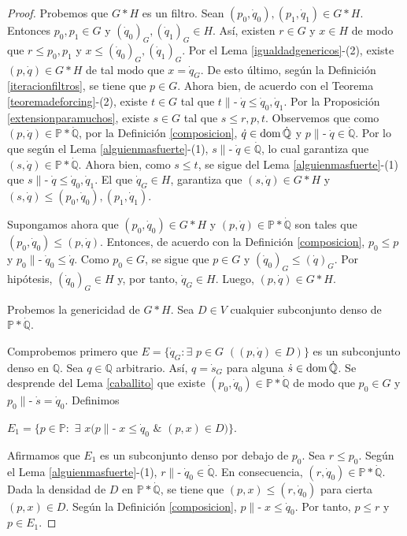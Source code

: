 \documentclass[11pt]{unam_tesis1}
\theoremstyle{MyThmStyle}
\theoremstyle{definition}
\theoremstyle{plain}
\theoremstyle{remark}
\def\dom{\mathop{\rm dom}\nolimits}
\def\forces{\mathop{\parallel\!\!\!-}\nolimits}
\let\Vdash\forces
\let\leq\leqslant
\begin{document}
\begin{proof}
Probemos que $G*H$ es un filtro. Sean $(p_0, \dot q_0), (p_1,\dot q_1)\in G*H$. Entonces $p_0,p_1\in G$ y $(\dot q_0)_G,(\dot q_1)_G\in H$. As\'i, existen $r\in G$ y $x\in H$ de modo que $r\leq p_0,p_1$ y $x\leq (\dot q_0)_G,(\dot q_1)_G$. Por el Lema \ref{igualdadgenericos}-(2), existe $(p,\dot q)\in G*H$ de tal modo que $x=\dot q_G$. De esto \'ultimo, seg\'un la Definici\'on \ref{iteracionfiltros}, se tiene que $p\in G$. Ahora bien, de acuerdo con el Teorema \ref{teoremadeforcing}-(2), existe $t\in G$ tal que $t\Vdash \dot q\leq \dot q_0,\dot q_1$. Por la Proposici\'on \ref{extensionparamuchos}, existe $s\in G$ tal que $s\leq r,p,t$. Observemos que como $(p,\dot q)\in \mathbb P*\dot{\mathbb Q}$, por la Definici\'on \ref{composicion}, $\dot q\in \dom \dot{\mathbb Q}$ y $p\Vdash \dot q\in \dot{\mathbb Q}$. Por lo que seg\'un el Lema \ref{alguienmasfuerte}-(1), $s\Vdash \dot q\in \dot{\mathbb Q}$, lo cual garantiza que $(s,\dot q)\in \mathbb P*\dot{\mathbb Q}$. Ahora bien, como $s\leq t$, se sigue del Lema \ref{alguienmasfuerte}-(1) que $s\Vdash \dot q\leq \dot q_0,\dot q_1$. El que $\dot q_G\in H$, garantiza que $(s,\dot q)\in G*H$ y $(s,\dot q)\leq (p_0,\dot q_0),(p_1,\dot q_1)$.

Supongamos ahora que $(p_0,\dot q_0)\in G*H$ y $(p,\dot q)\in \mathbb P*\dot{\mathbb Q}$ son tales que $(p_0,\dot q_0)\leq (p,\dot q)$. Entonces, de acuerdo con la Definici\'on \ref{composicion}, $p_0\leq p$ y $p_0\Vdash \dot q_0\leq \dot q$. Como $p_0\in G$, se sigue que $p\in G$ y $(\dot q_0)_G\leq (\dot q)_G$. Por hip\'otesis, $(\dot q_0)_G\in H$ y, por tanto, $\dot q_G\in H$. Luego, $(p,\dot q)\in G*H$.

Probemos la genericidad de $G*H$. Sea $D\in V$ cualquier subconjunto denso de $\mathbb P*\dot{\mathbb Q}$.

Comprobemos primero que $E=\{\dot q_G:\exists$ $p\in G$ $((p,\dot q)\in D )\}$ es un subconjunto denso en $\mathbb Q$. Sea $q\in \mathbb Q$ arbitrario. As\'i, $q=\dot s_G$ para alguna $\dot s\in \dom \dot{\mathbb Q}$. Se desprende del Lema \ref{caballito} que existe $(p_0,\dot q_0)\in \mathbb P*\dot{\mathbb Q}$ de modo que $p_0\in G$ y $p_0\Vdash \dot s=\dot q_0$. Definimos 

\begin{center}
$E_1=\{p\in \mathbb P:$ $\exists$ $x(p\Vdash x\leq \dot q_0$ $\&$ $(p,x)\in D) \}$.
\end{center}

Afirmamos que $E_1$ es un subconjunto denso por debajo de $p_0$. Sea $r\leq p_0$. Seg\'un el Lema \ref{alguienmasfuerte}-(1), $r\Vdash \dot q_0\in \dot{\mathbb Q}$. En consecuencia, $(r,\dot q_0)\in \mathbb P*\dot{\mathbb Q}$. Dada la densidad de $D$ en $\mathbb P*\dot{\mathbb Q}$, se tiene que $(p,x)\leq (r,\dot q_0)$ para cierta $(p,x)\in D$. Seg\'un la Definici\'on \ref{composicion}, $p\Vdash x\leq \dot q_0$. Por tanto, $p\leq r$ y $p\in E_1$.


\end{proof}
\end{document}
